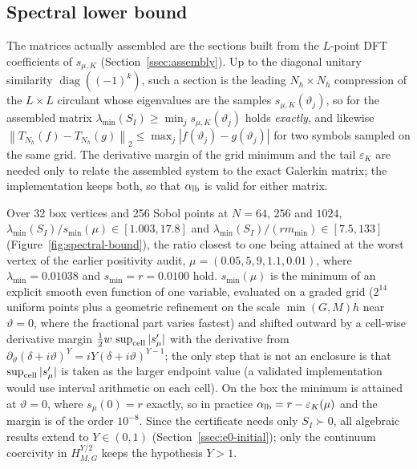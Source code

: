 \documentclass[hidelinks]{siamart251216}
\newcommand{\norm}[1]{\left\lVert #1\right\rVert}
\newcommand{\rf}{r}
\newcommand{\Tn}[2]{T_{#1}(#2)}          %
\newcommand{\sym}[1]{#1}                 %
\newcommand{\smin}{s_{\min}}
\begin{document}
\subsection{Spectral lower bound}
\label{ssec:spectral}


\begin{remark}\label{rem:compression}
The matrices actually assembled are the sections built from the $L$-point DFT coefficients of
$\sym{s}_{\mu,K}$ (Section~\ref{ssec:assembly}).  Up to the diagonal unitary similarity
$\operatorname{diag}((-1)^k)$, such a section is the leading $N_h\times N_h$ compression of the
$L\times L$ circulant whose eigenvalues are the samples $\sym{s}_{\mu,K}(\vartheta_j)$, so for the
assembled matrix $\lambda_{\min}(S_I)\ge\min_j\sym{s}_{\mu,K}(\vartheta_j)$ holds \emph{exactly},
and likewise $\norm{\Tn{N_h}{f}-\Tn{N_h}{g}}_2\le\max_j|f(\vartheta_j)-g(\vartheta_j)|$ for two
symbols sampled on the same grid.  The derivative margin of the grid minimum and the tail
$\varepsilon_K$ are needed only to relate the assembled system to the exact Galerkin matrix; the
implementation keeps both, so that $\alpha_{\rm lb}$ is valid for either matrix.
\end{remark}
Over 32 box vertices and 256 Sobol points at $N=64$, $256$ and $1024$,
$\lambda_{\min}(S_I)/\smin(\mu)\in[1.003,17.8]$ and $\lambda_{\min}(S_I)/(\rf m_{\min})\in[7.5,133]$
(Figure~\ref{fig:spectral-bound}), the ratio closest to one being attained at the worst vertex of
the earlier positivity audit, $\mu=(0.05,5,9,1.1,0.01)$, where $\lambda_{\min}=0.01038$ and
$\smin=\rf=0.0100$ hold.
$\smin(\mu)$ is the minimum of an explicit smooth even function of one variable, evaluated on a
graded grid ($2^{14}$ uniform points plus a geometric refinement on the scale $\min(G,M)h$ near
$\vartheta=0$, where the fractional part varies fastest) and shifted outward by a cell-wise
derivative margin $\tfrac12 w\,\sup_{\rm cell}|\sym{s}'_{\mu}|$ with the derivative from
$\partial_\vartheta(\delta+i\vartheta)^Y=iY(\delta+i\vartheta)^{Y-1}$; the only step that is not an
enclosure is that $\sup_{\rm cell}|\sym{s}'_\mu|$ is taken as the larger endpoint value (a validated
implementation would use interval arithmetic on each cell).  On the box the minimum is attained at
$\vartheta=0$, where $\sym{s}_\mu(0)=\rf$ exactly, so in practice $\alpha_{\rm lb}=\rf-\varepsilon_K(\mu)$
and the margin is of the order $10^{-8}$.
Since the certificate needs only $S_I\succ0$, all algebraic results extend to $Y\in(0,1)$
(Section~\ref{ssec:e0-initial}); only the continuum coercivity in $H^{Y/2}_{M,G}$ keeps the
hypothesis $Y>1$.
\end{document}
